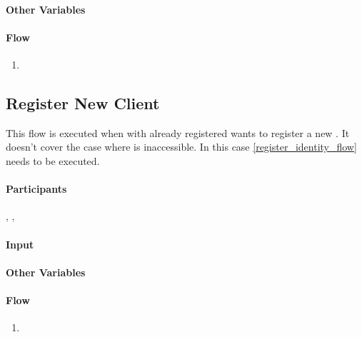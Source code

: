 \documentclass[a4paper,10pt]{article}
\begin{document}
\paragraph{Other Variables}
\SpecialItem
\begin{description}
 \item[]
\end{description}

\paragraph{Flow}

\begin{enumerate}
 \item
\end{enumerate}

\subsection{Register New Client}
\label{register_new_client_flow}
This flow is executed when  with already registered  wants to register a new . It doesn't cover the case where  is inaccessible. 
In this case \ref{register_identity_flow} needs to be executed.

\paragraph{Participants} , , 

\paragraph{Input}
\SpecialItem
\begin{description}
 \item[]
\end{description}

\paragraph{Other Variables}
\SpecialItem
\begin{description}
 \item[]
\end{description}

\paragraph{Flow}

\begin{enumerate}
 \item
\end{enumerate}



\end{document}
